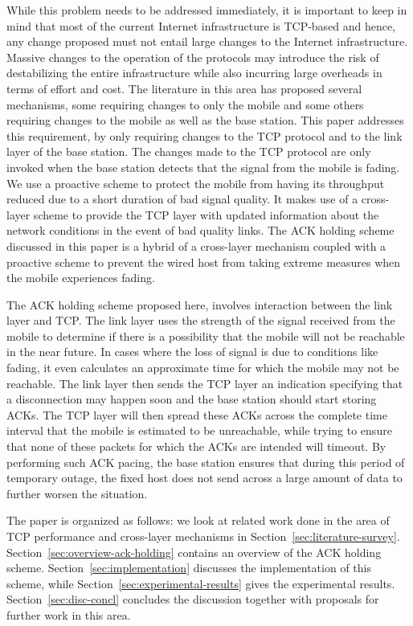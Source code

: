\documentclass[conference]{IEEEtran}
\begin{document}
While this problem needs to be addressed immediately, it is important to keep in mind that most of the current Internet infrastructure is TCP-based and hence, any change proposed must not entail large changes to the Internet infrastructure. Massive changes to the operation of the protocols may introduce the risk of destabilizing the entire infrastructure while also incurring large overheads in terms of effort and cost. The literature in this area has proposed several mechanisms, some requiring changes to only the mobile and some others requiring changes to the mobile as well as the base station. This paper addresses this requirement, by only requiring changes to the TCP protocol and to the link layer of the base station. The changes made to the TCP protocol are only invoked when the base station detects that the signal from the mobile is fading.
We use a proactive scheme to protect the mobile from having its throughput reduced due to a short duration of bad signal quality. It makes use of a cross-layer scheme to provide the TCP layer with updated information about the network conditions in the event of bad quality links. The ACK holding scheme discussed in this paper is a hybrid of a cross-layer mechanism coupled with a proactive scheme to prevent the wired host from taking extreme measures when the mobile experiences fading.

The ACK holding scheme proposed here, involves interaction between the link layer and TCP. The link layer uses the strength of the signal received from the mobile to determine if there is a possibility that the mobile will not be reachable in the near future. In cases where the loss of signal is due to conditions like fading, it even calculates an approximate time for which the mobile may not be reachable.  The link layer then sends the TCP layer an indication specifying that a disconnection may happen soon and the base station should start storing ACKs. The TCP layer will then spread these ACKs across the complete time interval that the mobile is estimated to be unreachable, while trying to ensure that none of these packets for which the ACKs are intended will timeout. By performing such ACK pacing, the base station ensures that during this period of temporary outage, the fixed host does not send across a large amount of data to further worsen the situation.


The paper is organized as follows: we look at related work done in the area of TCP performance and cross-layer mechanisms in Section~\ref{sec:literature-survey}. Section~\ref{sec:overview-ack-holding} contains an overview of the ACK holding scheme. Section~\ref{sec:implementation} discusses the implementation of this scheme, while Section~\ref{sec:experimental-results} gives the experimental results. Section~\ref{sec:disc-concl} concludes the discussion together with proposals for further work in this area. 
\end{document}
